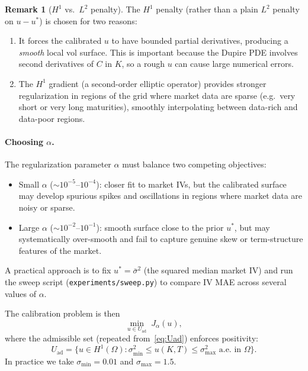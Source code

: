 \documentclass[11pt, a4paper]{article}
\newcommand{\Omg}{\Omega}
\theoremstyle{definition}
\newtheorem{remark}{Remark}[section]
\theoremstyle{plain}
\begin{document}
\begin{remark}[$H^1$ vs.\ $L^2$ penalty]
The $H^1$ penalty (rather than a plain $L^2$ penalty on $u - u^*$) is
chosen for two reasons:
\begin{enumerate}[label=(\roman*)]
  \item It forces the calibrated $u$ to have bounded partial derivatives,
        producing a \emph{smooth} local vol surface.  This is important
        because the Dupire PDE involves second derivatives of $C$ in $K$,
        so a rough $u$ can cause large numerical errors.
  \item The $H^1$ gradient (a second-order elliptic operator) provides
        stronger regularization in regions of the grid where market data are
        sparse (e.g.\ very short or very long maturities), smoothly
        interpolating between data-rich and data-poor regions.
\end{enumerate}
\end{remark}

\paragraph{Choosing $\alpha$.}
The regularization parameter $\alpha$ must balance two competing objectives:
\begin{itemize}
  \item Small $\alpha$ ($\sim 10^{-5}$--$10^{-4}$): closer fit to market IVs,
        but the calibrated surface may develop spurious spikes and oscillations
        in regions where market data are noisy or sparse.
  \item Large $\alpha$ ($\sim 10^{-2}$--$10^{-1}$): smooth surface close to
        the prior $u^*$, but may systematically over-smooth and fail to capture
        genuine skew or term-structure features of the market.
\end{itemize}
A practical approach is to fix $u^* = \bar{\sigma}^2$ (the squared median
market IV) and run the sweep script (\texttt{experiments/sweep.py}) to
compare IV MAE across several values of $\alpha$.

The calibration problem is then
\begin{equation}\label{eq:optproblem}
  \min_{u \in U_\text{ad}} \; J_\alpha(u),
\end{equation}
where the admissible set (repeated from~\eqref{eq:Uad}) enforces positivity:
\[
  U_\text{ad} = \bigl\{ u \in H^1(\Omg) :
    \sigma_{\min}^2 \leq u(K,T) \leq \sigma_{\max}^2
    \text{ a.e.\ in } \Omg \bigr\}.
\]
In practice we take $\sigma_{\min} = 0.01$ and $\sigma_{\max} = 1.5$.
\end{document}
